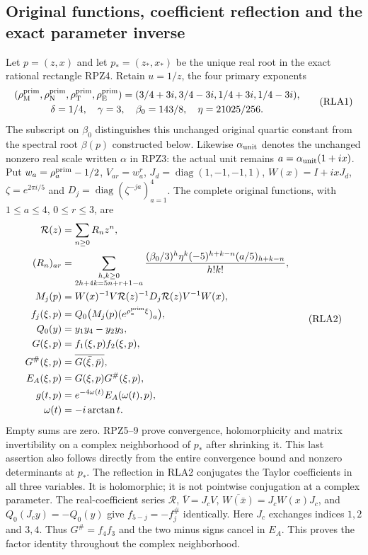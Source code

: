 \documentclass[11pt]{article}
\begin{document}
\subsection{Original functions, coefficient reflection and the exact parameter inverse}

Let $p=(z,x)$ and let $p_*=(z_*,x_*)$ be the unique real root in the
exact rational rectangle RPZ4.  Retain $u=1/z$, the four primary
exponents
\[
 \begin{gathered} (\rho_{\mathrm M}^{\rm prim},\rho_{\mathrm N}^{\rm prim},
 \rho_{\mathrm T}^{\rm prim},\rho_{\mathrm E}^{\rm prim})
 =(3/4+3i,3/4-3i,1/4+3i,1/4-3i),\\
 \delta=1/4,\quad\gamma=3,\quad\beta_0=143/8,\quad\eta=21025/256.
 \end{gathered}\tag{RLA1}
\]
The subscript on $\beta_0$ distinguishes this unchanged original
quartic constant from the spectral root $\beta(p)$ constructed below.
Likewise $\alpha_{\rm unit}$ denotes the unchanged nonzero real
scale written $\alpha$ in RPZ3: the actual unit remains
$a=\alpha_{\rm unit}(1+ix)$.
Put $w_a=\rho_a^{\rm prim}-1/2$, $V_{ar}=w_a^r$,
$J_d=\operatorname{diag}(1,-1,-1,1)$, $W(x)=I+ixJ_d$,
$\zeta=e^{2\pi i/5}$ and $D_j=\operatorname{diag}(\zeta^{-ja})_{a=1}^4$.
The complete original functions, with $1\le a\le4$, $0\le r\le3$, are
\[
\begin{aligned}
 \mathcal R(z)&=\sum_{n\ge0}R_nz^n,\\
 (R_n)_{ar}&=\sum_{\substack{h,k\ge0\\2h+4k=5n+r+1-a}}
 \frac{(\beta_0/3)^h\eta^k(-5)^{h+k-n}(a/5)_{h+k-n}}{h!k!},\\
 M_j(p)&=W(x)^{-1}V\mathcal R(z)^{-1}D_j\mathcal R(z)V^{-1}W(x),\\
 f_j(\xi,p)&=Q_0\bigl(M_j(p)(e^{\rho_a^{\rm prim}\xi})_a\bigr),\\
 Q_0(y)&=y_1y_4-y_2y_3,\\
 G(\xi,p)&=f_1(\xi,p)f_2(\xi,p),\\
 G^\#(\xi,p)&=\overline{G(\bar\xi,\bar p)},\\
 E_A(\xi,p)&=G(\xi,p)G^\#(\xi,p),\\
 g(t,p)&=e^{-4\omega(t)}E_A(\omega(t),p),\\
 \omega(t)&=-i\arctan t.
\end{aligned}\tag{RLA2}
\]
Empty sums are zero.  RPZ5--9 prove convergence, holomorphicity and
matrix invertibility on a complex neighborhood of $p_*$ after shrinking
it.  This last assertion also follows directly from the entire
convergence bound and nonzero determinants at $p_*$.
The reflection in RLA2 conjugates the Taylor coefficients in all three
variables.  It is holomorphic; it is not pointwise conjugation at a
complex parameter.  The real-coefficient series $\mathcal R$,
$\bar V=J_cV$, $\overline{W(\bar x)}=J_cW(x)J_c$, and
$Q_0(J_cy)=-Q_0(y)$ give $f_{5-j}=-f_j^\#$ identically.
Here $J_c$ exchanges indices $1,2$ and $3,4$.
Thus $G^\#=f_4f_3$ and the two minus signs cancel in $E_A$.
This proves the factor identity throughout the complex neighborhood.
\end{document}
